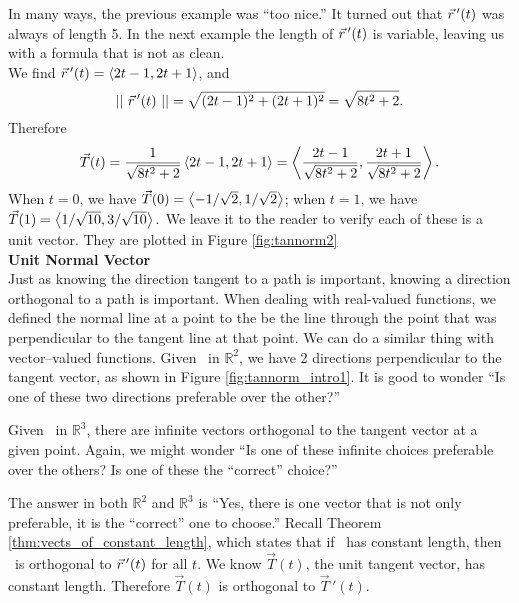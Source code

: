 In many ways, the previous example was ``too nice.'' It turned out that $\vec r\, '(t)$ was always of length 5. In the next example the length of $\vec r\, '(t)$ is variable, leaving us with a formula that is not as clean.\\

{We find $\vec r\, '(t) = \left\langle 2t-1,2t+1\right\rangle$, and $$||\ \vec r\, '(t)\ || = \sqrt{(2t-1)^2+(2t+1)^2} = \sqrt{8t^2+2}.$$
Therefore $$\vec T(t) = \frac{1}{\sqrt{8t^2+2}}\left\langle 2t-1,2t+1\right\rangle = \left\langle \frac{2t-1}{\sqrt{8t^2+2}},\frac{2t+1}{\sqrt{8t^2+2}}\right\rangle.$$
When $t=0$, we have $\vec T(0) = \left\langle -1/\sqrt{2},1/\sqrt{2}\right\rangle$; when $t=1$, we have $\vec T(1) = \left\langle 1/\sqrt{10}, 3/\sqrt{10}\right\rangle.$ We leave it to the reader to verify each of these is a unit vector. They are plotted in Figure \ref{fig:tannorm2}
}\\

\noindent\textbf{\large Unit Normal Vector}\\

Just as knowing the direction tangent to a path is important, knowing a direction orthogonal to a path is important. When dealing with real-valued functions, we defined the normal line at a point to the be the line through the point that was perpendicular to the tangent line at that point. We can do a similar thing with vector--valued functions. Given \vrt\ in $\mathbb{R}^2$, we have 2 directions perpendicular to the tangent vector, as shown in Figure \ref{fig:tannorm_intro1}. It is good to wonder ``Is one of these two directions preferable over the other?''

Given \vrt\ in $\mathbb{R}^3$,  there are infinite vectors orthogonal to the tangent vector at a given point. Again, we might wonder ``Is one of these infinite choices preferable over the others? Is one of these the ``correct'' choice?''

The answer in both $\mathbb{R}^2$ and $\mathbb{R}^3$ is ``Yes, there is one vector that is not only preferable, it is the ``correct'' one to choose.'' Recall Theorem \ref{thm:vects_of_constant_length}, which states that if \vrt\ has constant length, then \vrt\ is orthogonal to $\vec r\, '(t)$ for all $t$. We know $\vec T(t)$, the unit tangent vector, has constant length. Therefore $\vec T(t)$ is orthogonal to $\vec T\,'(t)$.

